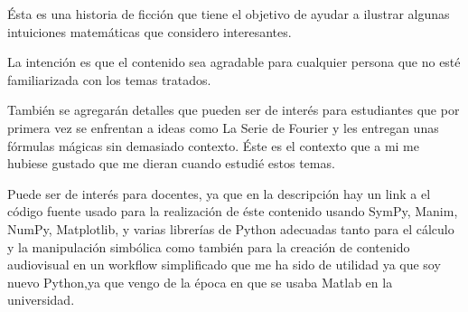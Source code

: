 \documentclass[preview]{standalone}
\begin{document}
\begin{center}
Ésta es una historia de ficción que tiene el objetivo de ayudar a ilustrar algunas intuiciones matemáticas que considero interesantes. 

$$ $$
La intención es que el contenido sea agradable para cualquier persona que no esté familiarizada con los temas tratados.  

$$ $$
También se agregarán detalles que pueden ser de interés para estudiantes que por primera vez se enfrentan a ideas como La Serie de Fourier y les entregan unas fórmulas mágicas sin demasiado contexto. Éste es el contexto que a mi me hubiese gustado que me dieran cuando estudié estos temas. 

$$ $$
Puede ser de interés para docentes, ya que en la descripción hay un link a el código fuente usado para la realización de éste contenido usando SymPy, Manim, NumPy, Matplotlib, y varias librerías de Python adecuadas tanto para el cálculo y la manipulación simbólica como también para la creación de contenido audiovisual en un workflow simplificado que me ha sido de utilidad ya que  soy nuevo Python,ya que vengo de la época en que se usaba Matlab en la universidad.
\end{center}
\end{document}
